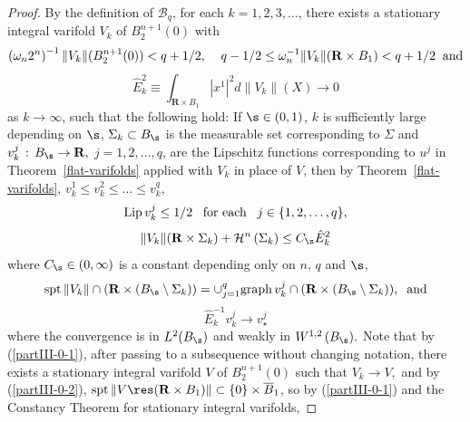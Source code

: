 \documentclass[a4paper,11pt]{amsart}
\begin{document}
\begin{proof}
By the definition of ${\mathcal B}_{q}$, for each $k = 1, 2, 3, \ldots$, there exists a stationary integral 
varifold $V_{k}$ of $B_{2}^{n+1}(0)$ with
\begin{equation}\label{partIII-0-1}
\left(\omega_{n}2^{n}\right)^{-1}\|V_{k}\|(B_{2}^{n+1}(0)) < q + 1/2, \;\;\;\; q-1/2\leq \omega_{n}^{-1}\|V_{k}\|({\mathbf R} \times B_{1}) < q+1/2 \;\; {\rm and}
\end{equation}
\begin{equation}\label{partIII-0-2}
{\hat E}_{k}^{2} \equiv \int_{{\mathbf R} \times B_{1}} |x^{1}|^{2}d\|V_{k}\|(X) \to 0
\end{equation}
as $k \to \infty$, such that the following hold: If  
$\s \in (0, 1)$, $k$ is sufficiently large depending on $\s$, $\Sigma_{k} \subset B_{\s}$ is the measurable set corresponding to $\Sigma$ and $v_{k}^{j} \, : \, B_{\s} 
\to {\mathbf R},$ $j=1, 2, \ldots, q$, are the Lipschitz functions corresponding to $u^{j}$ in Theorem~\ref{flat-varifolds} applied with $V_{k}$ in place of $V$, then by Theorem~\ref{flat-varifolds}, 
$v_{k}^{1} \leq v_{k}^{2} \leq \ldots \leq v_{k}^{q},$ 
\begin{equation}\label{partIII-1}
{\rm Lip} \, v_{k}^{j} \leq 1/2 \;\;\; \mbox{for each} \;\;\;  j \in \{1, 2, \ldots, q\},
\end{equation}
\begin{equation}\label{partIII-2}
\|V_{k}\|({\mathbf R} \times \Sigma_{k}) + {\mathcal H}^{n} \, (\Sigma_{k}) \leq C_{\s}{\hat E}_{k}^{2}
\end{equation}
where $C_{\s} \in (0, \infty)$ is a constant depending only on $n$, $q$ and $\s$,  
\begin{equation}\label{partIII-2-0}
{\rm spt} \, \|V_{k}\| \cap ({\mathbf R} \times (B_{\s} \setminus \Sigma_{k})) = 
\cup_{j=1}^{q} {\rm graph} \, v_{k}^{j} \cap ({\mathbf R} \times (B_{\s} \setminus \Sigma_{k})), \;\; {\rm and}
\end{equation}
\begin{equation}\label{partIII-2-1}
{\hat E}_{k}^{-1}v_{k}^{j} \to v_{\star}^{j}
\end{equation}
where the convergence is in $L^{2}(B_{\s})$ and 
weakly in $W^{1, 2} \, (B_{\s}).$ Note that by (\ref{partIII-0-1}), after passing to a subsequence without changing notation, there exists a stationary integral varifold $V$ of $B_{2}^{n+1}(0)$ such that $V_{k} \to V,$  
and by (\ref{partIII-0-2}), ${\rm spt} \, \|V \res ({\mathbf R}  \times B_{1})\| \subset \{0\} \times \overline{B}_{1}$, so by (\ref{partIII-0-1}) and the Constancy Theorem for stationary integral varifolds, 

\end{proof}
\end{document}
